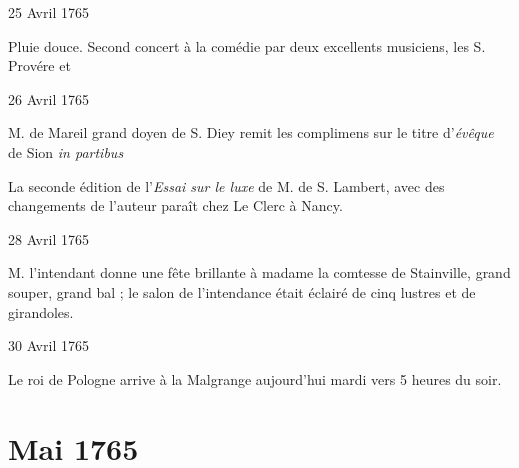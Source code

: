                      \begin{diary}{25 Avril 1765}{}


                           Pluie douce. Second concert à la
                              comédie
                           par deux excellents musiciens, les S.
                              Provére et
                        \bigskip


                     \end{diary}

                     \begin{diary}{26 Avril 1765}{}


                           M. de Mareil
                           grand doyen de S. Diey remit
                           les complimens sur le titre d'\emph{évêque} de
                           Sion
                           \emph{in partibus}
                        \bigskip


                         La seconde édition de l'\emph{Essai sur le luxe} de
                           M. de S.
                              Lambert,
                           avec des changements de
                           l'auteur paraît chez
                           Le Clerc à Nancy. \bigskip


                     \end{diary}

                     \begin{diary}{28 Avril 1765}{}


                           M. l'intendant donne une fête
                           brillante
                           à madame la comtesse de Stainville, grand souper,
                           grand bal ; le salon de l'intendance était
                           éclairé de cinq lustres et de girandoles. \bigskip


                     \end{diary}

                     \begin{diary}{30 Avril 1765}{}


                           Le roi de Pologne arrive à la
                              Malgrange aujourd'hui
                           mardi vers 5 heures du soir. \bigskip


                     \end{diary}
                  \chapter*{Mai 1765}




